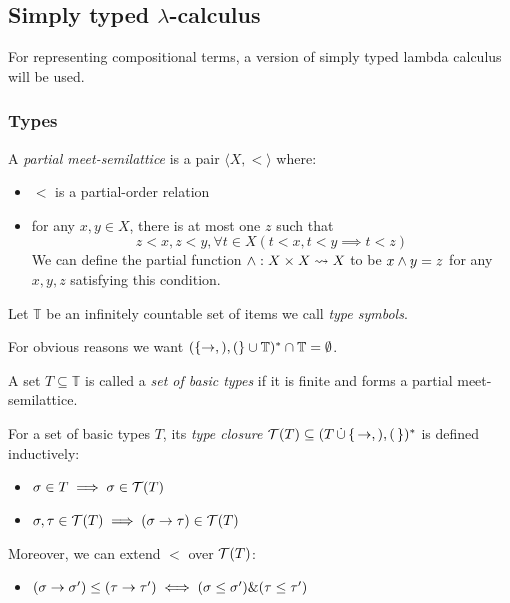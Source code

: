 \documentclass[main.tex]{subfiles}
\begin{document}
\subsection{Simply typed $\lambda$-calculus}
\label{sec:lambda}

For representing compositional terms, a version of simply typed lambda calculus
will be used.

\subsubsection{Types}
\begin{defn}
    A \emph{partial meet-semilattice} is a pair $\langle X, \less \rangle$ where:
    \begin{itemize}
        \item $\less$ is a partial-order relation
        \item for any $x, y \in X$, there is at most one $z$ such that
        \[  z \less x, z \less y,
            \forall t \in X (t \less x, t \less y \implies t \less z) \]
        We can define the partial function $\wedge : X \times X \leadsto X$ to
        be $x \wedge y = z$ for any $x, y, z$ satisfying this condition.
    \end{itemize}
\end{defn}

\begin{defn}
    Let $\mathbb{T}$ be an infinitely countable set of items we call
    \emph{type symbols}.

    For obvious reasons we want $(\{ \rightarrow, ), ( \} \cup \mathbb{T})^*
    \cap \mathbb{T} = \emptyset$.
\end{defn}

\begin{defn}
    A set $T \subseteq \mathbb{T}$ is called a \emph{set of basic types}
    if it is finite and forms a partial meet-semilattice.
\end{defn}

\begin{defn}
    For a set of basic types $T$, its \emph{type closure}
    $\mathcal{T}( T ) \subseteq (T \, \dot\cup \,\{\, \rightarrow, ), ( \,\})^*$ is defined
    inductively:

    \begin{itemize}
        \item $\sigma \in T \implies \sigma \in \mathcal{T}( T )$
        \item $\sigma, \tau \in \mathcal{T}( T ) \implies (\sigma \rightarrow \tau) \in \mathcal{T}( T )$
    \end{itemize}

    Moreover, we can extend $\less$ over
    $\mathcal{T}( T )$:
    \begin{itemize}
        \item $(\sigma \rightarrow \sigma') \leq (\tau \rightarrow \tau') \iff (\sigma \leq \sigma')
            \& (\tau \leq \tau')$
    \end{itemize}
\end{defn}
\end{document}
